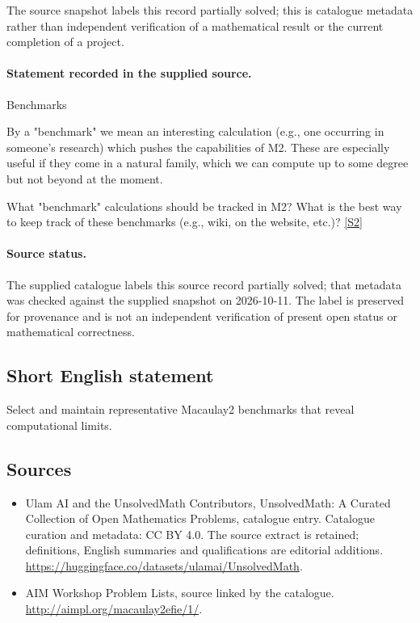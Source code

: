 \documentclass[11pt]{article}
\begin{document}
The source snapshot labels this record partially solved; this is catalogue metadata rather than independent verification of a mathematical result or the current completion of a project.
\paragraph{Statement recorded in the supplied source.}
Benchmarks

By a "benchmark" we mean an interesting calculation (e.g., one occurring in someone's research) which pushes the capabilities of M2. These are especially useful if they come in a natural family, which we can compute up to some degree but not beyond at the moment.

What "benchmark" calculations should be tracked in M2? What is the best way to keep track of these benchmarks (e.g., wiki, on the website, etc.)? \href{http://aimpl.org/macaulay2efie/1/}{[S2]}
\paragraph{Source status.}
The supplied catalogue labels this source record partially solved; that metadata was checked against the supplied snapshot on 2026-10-11. The label is preserved for provenance and is not an independent verification of present open status or mathematical correctness.
\subsection{Short English statement}
Select and maintain representative Macaulay2 benchmarks that reveal computational limits.
\subsection{Sources}
\begin{itemize}
\item[S1] Ulam AI and the UnsolvedMath Contributors, UnsolvedMath: A Curated Collection of Open Mathematics Problems, catalogue entry. Catalogue curation and metadata: CC BY 4.0. The source extract is retained; definitions, English summaries and qualifications are editorial additions.
\url{https://huggingface.co/datasets/ulamai/UnsolvedMath}.
\item[S2] AIM Workshop Problem Lists, source linked by the catalogue.
\url{http://aimpl.org/macaulay2efie/1/}.
\end{itemize}
\end{document}
